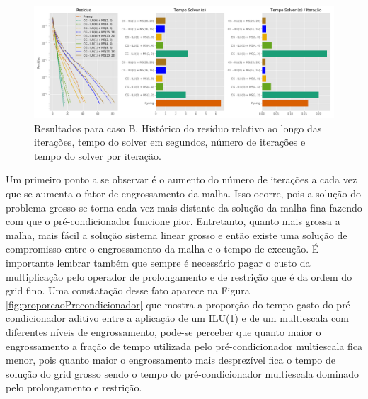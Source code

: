 \begin{figure}[!htbp]
\centering
\includegraphics[width=\textwidth]{chap08/figs/reservatorio320x320_1.png}
\caption{Resultados para caso B. Histórico do resíduo relativo ao longo das iterações, tempo do solver em segundos, número de iterações e tempo do solver por iteração. }
\label{fig:reservatorio320x320_1} 
\end{figure}


Um primeiro ponto a se observar é o aumento do número de iterações a cada vez que se aumenta o fator de engrossamento da malha. Isso ocorre, pois a solução do problema grosso se torna cada vez mais distante da solução da malha fina fazendo com que o pré-condicionador funcione pior. Entretanto, quanto mais grossa a malha, mais fácil a solução sistema linear grosso e então existe uma solução de compromisso entre o engrossamento da malha e o tempo de execução. É importante lembrar também que sempre é necessário pagar o custo da multiplicação pelo operador de prolongamento e de restrição que é da ordem do grid fino. Uma constatação desse fato aparece na Figura \ref{fig:proporcaoPrecondicionador} que mostra a proporção do tempo gasto do pré-condicionador aditivo entre a aplicação de um ILU(1) e de um multiescala com diferentes níveis de engrossamento, pode-se perceber que quanto maior o engrossamento a fração de tempo utilizada pelo pré-condicionador multiescala fica menor, pois quanto maior o engrossamento mais desprezível fica o tempo de solução do grid grosso sendo o tempo do pré-condicionador multiescala dominado pelo prolongamento e restrição.


